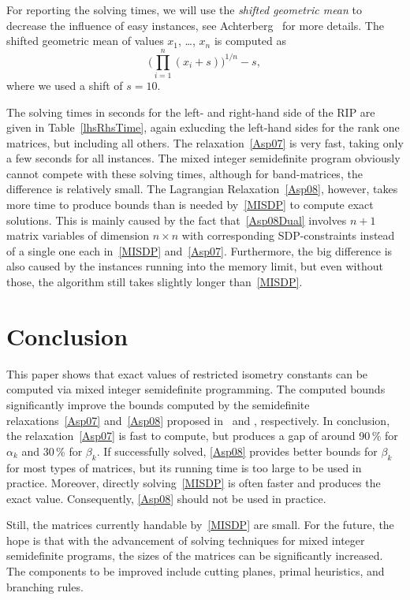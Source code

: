 \documentclass[journal]{IEEEtran}
\begin{document}
For reporting the solving times, we will use the \emph{shifted
  geometric mean} to decrease the influence of easy instances, see
Achterberg~\cite{SCIP} for more details. The shifted geometric
mean of values $x_1$, \dots, $x_n$ is computed as
\begin{equation*}
  \Big( \prod_{i=1}^n (x_i + s)\Big)^{1/n} - s,
\end{equation*}
where we used a shift of $s=10$.

The solving times in seconds for the left- and right-hand side of the RIP are given in
Table~\ref{lhsRhsTime}, again exlucding the left-hand sides for the rank one matrices,
but including all others. The relaxation~\eqref{Asp07}
is very fast, taking only a few seconds for all instances. The mixed integer semidefinite program obviously
cannot compete with these solving times, although for band-matrices, the difference is relatively
small. The Lagrangian Relaxation~\eqref{Asp08}, however, takes more time to produce bounds than is needed
by~\eqref{MISDP} to compute exact solutions. This is mainly caused by the fact that~\eqref{Asp08Dual} involves
$n+1$ matrix variables of dimension $n\times n$ with corresponding SDP-constraints instead of a 
single one each in~\eqref{MISDP} and~\eqref{Asp07}.
Furthermore, the big difference is also caused by the instances running into the 
memory limit, but even without those, the algorithm still takes slightly longer than~\eqref{MISDP}.



\section{Conclusion}

\noindent
This paper shows that exact values of restricted isometry constants can be
computed via mixed integer semidefinite programming. The computed bounds
significantly improve the bounds computed by the semidefinite
relaxations~\eqref{Asp07} and~\eqref{Asp08}
proposed in~\cite{Asp07} and \cite{Asp08}, respectively. In conclusion, the
relaxation~\eqref{Asp07}
is fast to compute, but produces a gap of around 90\,\% for
$\alpha_k$ and 30\,\% for $\beta_k$. If successfully solved, 
\eqref{Asp08} provides better bounds for $\beta_k$ for most types of 
matrices, but its running time is too large
to be used in practice. Moreover, directly solving~\eqref{MISDP} is often
faster and produces the exact value. Consequently, 
\eqref{Asp08} should not be used in practice.

Still, the matrices currently handable by~\eqref{MISDP} are small. For the
future, the hope is that with the advancement of solving techniques for
mixed integer semidefinite programs, the sizes of the matrices can be
significantly increased. The components to be improved include cutting
planes, primal heuristics, and branching rules.



\end{document}
